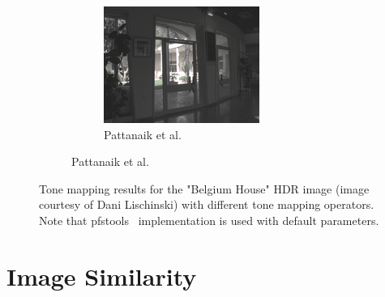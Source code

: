 \begin{figure}
\begin{subfigure}[t]{\textwidth}
\begin{subfigure}[t]{0.33\textwidth}
    \includegraphics[width=\textwidth]{figures/chapter2/tmos44/44_pattanaik00.png}
    \caption{Pattanaik et al.~\cite{pattanaik2000time}}
\end{subfigure}\hfill
\end{subfigure}
\caption{Tone mapping results for the "Belgium House" HDR image (image courtesy of Dani Lischinski) with different tone mapping operators. Note that pfstools~\cite{HDRGallery} implementation is used with default parameters.}
\label{fig:tmos}
\end{figure}

\section{Image Similarity}

